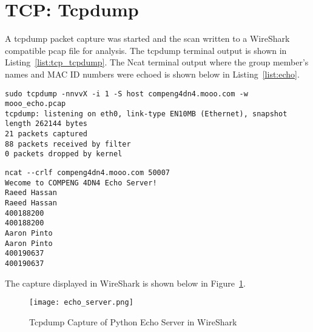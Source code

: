 \section*{TCP: Tcpdump}
A tcpdump packet capture was started and the scan written to a WireShark compatible pcap file for analysis. The tcpdump terminal output is shown in Listing~\ref{list:tcp_tcpdump}. The Ncat terminal output where the group member's names and MAC ID numbers were echoed is shown below in Listing~\ref{list:echo}.

\begin{lstlisting}[caption=Tcpdump Packet Capture of Python Echo Server Connection,label=list:tcp_tcpdump]
sudo tcpdump -nnvvX -i 1 -S host compeng4dn4.mooo.com -w mooo_echo.pcap
tcpdump: listening on eth0, link-type EN10MB (Ethernet), snapshot length 262144 bytes
21 packets captured
88 packets received by filter
0 packets dropped by kernel
\end{lstlisting}

\begin{lstlisting}[caption=Ncat Connection to Python Echo Server,label=list:echo]
ncat --crlf compeng4dn4.mooo.com 50007
Wecome to COMPENG 4DN4 Echo Server!
Raeed Hassan
Raeed Hassan
400188200
400188200
Aaron Pinto
Aaron Pinto
400190637
400190637
\end{lstlisting}

The capture displayed in WireShark is shown below in Figure~\ref{fig:echo_wireshark}.

\begin{figure}[htp]
\centering
\caption[echo_wireshark]{Tcpdump Capture of Python Echo Server in WireShark}\label{fig:echo_wireshark}
\texttt{[image: echo\_server.png]}
\end{figure}